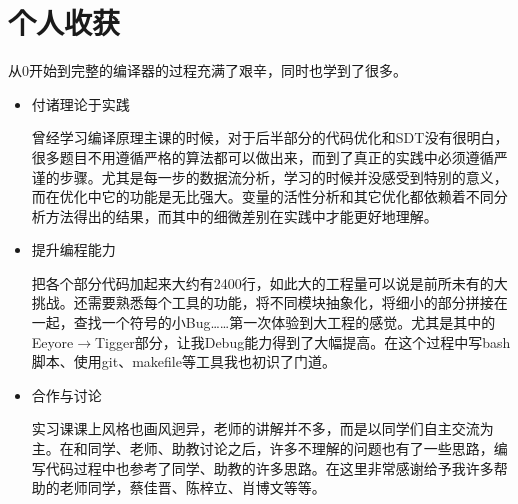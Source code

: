 \documentclass{ctexart}
\begin{document}
\section{个人收获}
从0开始到完整的编译器的过程充满了艰辛，同时也学到了很多。
\begin{itemize}
  \item 付诸理论于实践

  曾经学习编译原理主课的时候，对于后半部分的代码优化和SDT没有很明白，很多题目不用遵循严格的算法都可以做出来，而到了真正的实践中必须遵循严谨的步骤。尤其是每一步的数据流分析，学习的时候并没感受到特别的意义，而在优化中它的功能是无比强大。变量的活性分析和其它优化都依赖着不同分析方法得出的结果，而其中的细微差别在实践中才能更好地理解。

  \item 提升编程能力

  把各个部分代码加起来大约有2400行，如此大的工程量可以说是前所未有的大挑战。还需要熟悉每个工具的功能，将不同模块抽象化，将细小的部分拼接在一起，查找一个符号的小Bug……第一次体验到大工程的感觉。尤其是其中的Eeyore$\rightarrow$Tigger部分，让我Debug能力得到了大幅提高。在这个过程中写bash脚本、使用git、makefile等工具我也初识了门道。

  \item 合作与讨论

  实习课课上风格也画风迥异，老师的讲解并不多，而是以同学们自主交流为主。在和同学、老师、助教讨论之后，许多不理解的问题也有了一些思路，编写代码过程中也参考了同学、助教的许多思路。在这里非常感谢给予我许多帮助的老师同学，蔡佳晋、陈梓立、肖博文等等。

\end{itemize}
\end{document}

